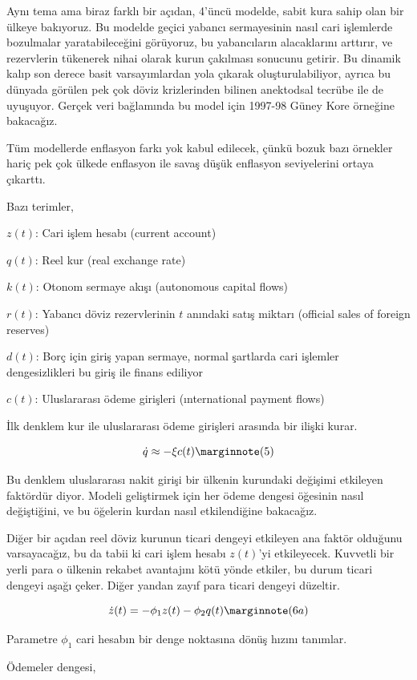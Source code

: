 \documentclass[12pt,fleqn]{article}\usepackage{../../common}
\begin{document}
Aynı tema ama biraz farklı bir açıdan, 4'üncü modelde, sabit kura sahip
olan bir ülkeye bakıyoruz. Bu modelde geçici yabancı sermayesinin nasıl
cari işlemlerde bozulmalar yaratabileceğini görüyoruz, bu yabancıların
alacaklarını arttırır, ve rezervlerin tükenerek nihai olarak kurun
çakılması sonucunu getirir. Bu dinamik kalıp son derece basit
varsayımlardan yola çıkarak oluşturulabiliyor, ayrıca bu dünyada görülen
pek çok döviz krizlerinden bilinen anektodsal tecrübe ile de
uyuşuyor. Gerçek veri bağlamında bu model için 1997-98 Güney Kore örneğine
bakacağız.

Tüm modellerde enflasyon farkı yok kabul edilecek, çünkü bozuk bazı
örnekler hariç pek çok ülkede enflasyon ile savaş düşük enflasyon
seviyelerini ortaya çıkarttı. 

Bazı terimler,

$z(t)$: Cari işlem hesabı (current account)

$q(t)$: Reel kur (real exchange rate)

$k(t)$: Otonom sermaye akışı (autonomous capital flows)

$r(t)$: Yabancı döviz rezervlerinin $t$ anındaki satış miktarı (official sales of foreign reserves)

$d(t)$: Borç için giriş yapan sermaye, normal şartlarda cari işlemler
dengesizlikleri bu giriş ile finans ediliyor

$c(t)$: Uluslararası ödeme girişleri (ınternational payment flows)

İlk denklem kur ile uluslararası ödeme girişleri arasında bir ilişki
kurar. 

$$
\dot{q} \approx -\xi c(t)
\mlabel{5}
$$

Bu denklem uluslararası nakit girişi bir ülkenin kurundaki değişimi
etkileyen faktördür diyor. Modeli geliştirmek için her ödeme dengesi
öğesinin nasıl değiştiğini, ve bu öğelerin kurdan nasıl etkilendiğine
bakacağız. 

Diğer bir açıdan reel döviz kurunun ticari dengeyi etkileyen ana faktör
olduğunu varsayacağız, bu da tabii ki cari işlem hesabı $z(t)$'yi
etkileyecek. Kuvvetli bir yerli para o ülkenin rekabet avantajını kötü
yönde etkiler, bu durum ticari dengeyi aşağı çeker. Diğer yandan zayıf para
ticari dengeyi düzeltir. 

$$
\dot{z}(t) = -\phi_1 z(t)  - \phi_2 q(t) 
\mlabel{6a}
$$

Parametre $\phi_1$ cari hesabın bir denge noktasına dönüş hızını tanımlar. 

Ödemeler dengesi,
\end{document}
